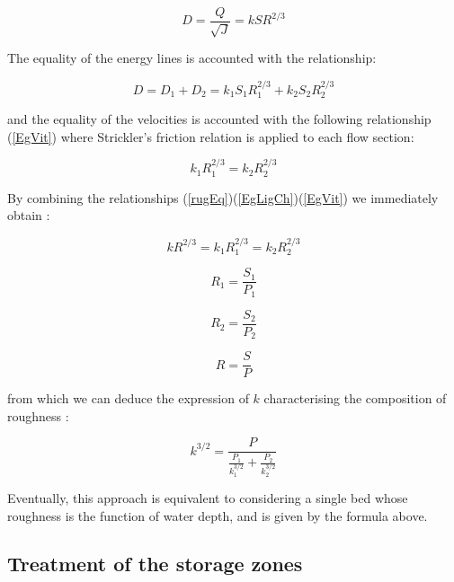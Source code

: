 \begin{equation}
  \label{rugEq}
  D = \frac{Q}{\sqrt{J}}= k S R^{2/3}
\end{equation}

The equality of the energy lines is accounted with the relationship:

\begin{equation}
  \label{EgLigCh}
  D = D_1 + D_2 = k_1 S_1 R_{1}^{2/3} + k_2 S_2 R_{2}^{2/3}
\end{equation}

and the equality of the velocities is accounted with the following relationship (\ref{EgVit}) where Strickler's friction relation is applied to each flow section:

\begin{equation}
  \label{EgVit}
  k_1 R_{1}^{2/3} = k_2 R_{2}^{2/3}
\end{equation}

By combining the relationships (\ref{rugEq})(\ref{EgLigCh})(\ref{EgVit}) we immediately obtain :

\begin{equation}
  k R^{2/3} = k_1 R_{1}^{2/3} = k_2 R_{2}^{2/3}
\end{equation}

\begin{equation}
  R_1 = \frac{S_1}{P_1}
\end{equation}

\begin{equation}
  R_2 = \frac{S_2}{P_2}
\end{equation}

\begin{equation}
  R = \frac{S}{P}
\end{equation}

from which we can deduce the expression of $k$ characterising the composition of roughness :

\begin{equation}
  k^{3/2} = \frac{P}{\displaystyle \frac{P_1}{k_{1}^{3/2}}+\frac{P_2}{k_{2}^{3/2}}}
\end{equation}

Eventually, this approach is equivalent to considering a single bed whose roughness is the function of water depth, and is given by the formula above.

\subsection{Treatment of the storage zones}

